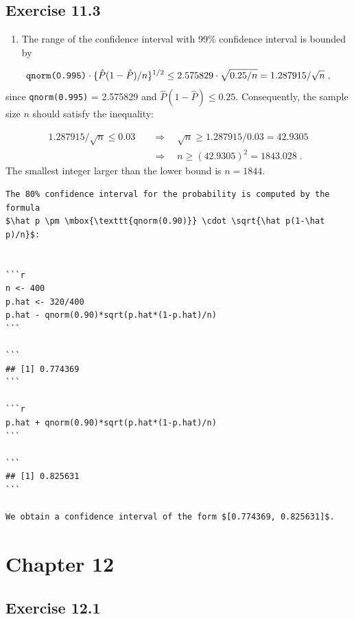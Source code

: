 \documentclass[
]{krantz}
\providecommand{\tightlist}{%
  \setlength{\itemsep}{0pt}\setlength{\parskip}{0pt}}
\theoremstyle{definition}
\theoremstyle{definition}
\theoremstyle{definition}
\theoremstyle{remark}
\begin{document}
\hypertarget{exercise-11.3}{%
\subsection*{Exercise 11.3}\label{exercise-11.3}}


\begin{enumerate}
\def\labelenumi{\arabic{enumi}.}
\tightlist
\item
  The range of the confidence
  interval with 99\% confidence interval is bounded by
\end{enumerate}

\[\mbox{\texttt{qnorm(0.995)}}\cdot \{\hat P (1-\hat P)/n\}^{1/2} \leq 2.575829 \cdot \sqrt{0.25/n} = 1.287915/\sqrt{n}\;,\]
since \texttt{qnorm(0.995)} = 2.575829 and \(\hat P (1-\hat P) \leq 0.25\).
Consequently, the sample size \(n\) should satisfy the inequality:

\[\begin{aligned}
1.287915/\sqrt{n} \leq 0.03\quad  &\Longrightarrow  \quad \sqrt{n} \geq 1.287915/0.03 = 42.9305\\
&\Longrightarrow \quad  n \geq (42.9305)^2 = 1843.028\;.\end{aligned}\]
The smallest integer larger than the lower bound is \(n=1844\).

\begin{verbatim}
The 80% confidence interval for the probability is computed by the formula
$\hat p \pm \mbox{\texttt{qnorm(0.90)}} \cdot \sqrt{\hat p(1-\hat p)/n}$:


```r
n <- 400
p.hat <- 320/400
p.hat - qnorm(0.90)*sqrt(p.hat*(1-p.hat)/n)
```

```
## [1] 0.774369
```

```r
p.hat + qnorm(0.90)*sqrt(p.hat*(1-p.hat)/n)
```

```
## [1] 0.825631
```

We obtain a confidence interval of the form $[0.774369, 0.825631]$.
\end{verbatim}

\hypertarget{chapter-12}{%
\section*{Chapter 12}\label{chapter-12}}


\hypertarget{exercise-12.1}{%
\subsection*{Exercise 12.1}\label{exercise-12.1}}
\end{document}
